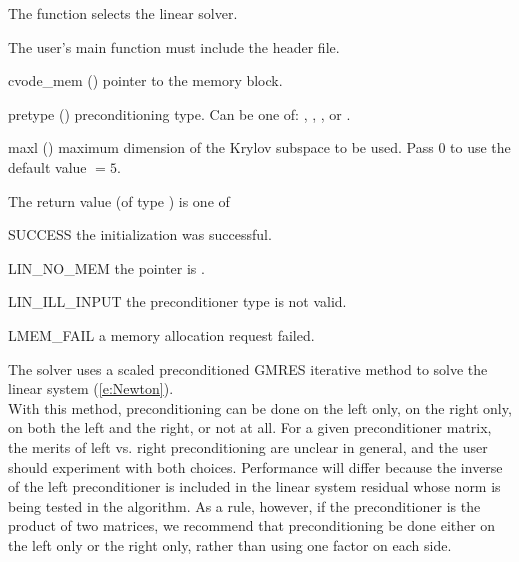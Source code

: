 {
  The function  selects the {\cvspgmr} linear solver. 

  The user's main function must include the  header file.
}
{
  \begin{args}
  \item[cvode\_mem] ()
    pointer to the {\cvodes} memory block.
  \item[pretype] ()
    preconditioning type. Can be one of: , , , or .
  \item[maxl] ()
    maximum dimension of the Krylov subspace to be used. Pass $0$ to use the 
    default value $=5$.
  \end{args}
}
{
  The return value  (of type ) is one of
  \begin{args}
  \item[SUCCESS] 
    the {\cvspgmr} initialization was successful.
  \item[LIN\_NO\_MEM]
    the  pointer is .
  \item[LIN\_ILL\_INPUT]
    the preconditioner type  is not valid.
  \item[LMEM\_FAIL]
    a memory allocation request failed.
  \end{args}
}
{
  The {\cvspgmr} solver uses a scaled preconditioned GMRES
  iterative method to solve the linear system (\ref{e:Newton}).\\
  With this {\spgmr} method, preconditioning 
  can be done on the left only, on the right only, on both the left and the right, 
  or not at all.  For a given preconditioner matrix, the merits of left vs. right
  preconditioning are unclear in general, and the user should experiment
  with both choices.  Performance will differ because the inverse of the
  left preconditioner is included in the linear system residual whose
  norm is being tested in the {\spgmr} algorithm.  As a rule, however, if
  the preconditioner is the product of two matrices, we recommend that
  preconditioning be done either on the left only or the right only,
  rather than using one factor on each side.
}

